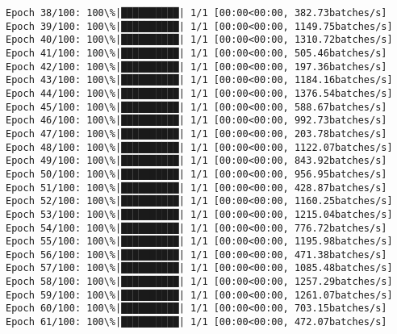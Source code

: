 \documentclass[11pt]{article}
\begin{document}
\begin{Verbatim}[commandchars=\\\{\}]
Epoch 38/100: 100\%|██████████| 1/1 [00:00<00:00, 382.73batches/s]
Epoch 39/100: 100\%|██████████| 1/1 [00:00<00:00, 1149.75batches/s]
Epoch 40/100: 100\%|██████████| 1/1 [00:00<00:00, 1310.72batches/s]
Epoch 41/100: 100\%|██████████| 1/1 [00:00<00:00, 505.46batches/s]
Epoch 42/100: 100\%|██████████| 1/1 [00:00<00:00, 197.36batches/s]
Epoch 43/100: 100\%|██████████| 1/1 [00:00<00:00, 1184.16batches/s]
Epoch 44/100: 100\%|██████████| 1/1 [00:00<00:00, 1376.54batches/s]
Epoch 45/100: 100\%|██████████| 1/1 [00:00<00:00, 588.67batches/s]
Epoch 46/100: 100\%|██████████| 1/1 [00:00<00:00, 992.73batches/s]
Epoch 47/100: 100\%|██████████| 1/1 [00:00<00:00, 203.78batches/s]
Epoch 48/100: 100\%|██████████| 1/1 [00:00<00:00, 1122.07batches/s]
Epoch 49/100: 100\%|██████████| 1/1 [00:00<00:00, 843.92batches/s]
Epoch 50/100: 100\%|██████████| 1/1 [00:00<00:00, 956.95batches/s]
Epoch 51/100: 100\%|██████████| 1/1 [00:00<00:00, 428.87batches/s]
Epoch 52/100: 100\%|██████████| 1/1 [00:00<00:00, 1160.25batches/s]
Epoch 53/100: 100\%|██████████| 1/1 [00:00<00:00, 1215.04batches/s]
Epoch 54/100: 100\%|██████████| 1/1 [00:00<00:00, 776.72batches/s]
Epoch 55/100: 100\%|██████████| 1/1 [00:00<00:00, 1195.98batches/s]
Epoch 56/100: 100\%|██████████| 1/1 [00:00<00:00, 471.38batches/s]
Epoch 57/100: 100\%|██████████| 1/1 [00:00<00:00, 1085.48batches/s]
Epoch 58/100: 100\%|██████████| 1/1 [00:00<00:00, 1257.29batches/s]
Epoch 59/100: 100\%|██████████| 1/1 [00:00<00:00, 1261.07batches/s]
Epoch 60/100: 100\%|██████████| 1/1 [00:00<00:00, 703.15batches/s]
Epoch 61/100: 100\%|██████████| 1/1 [00:00<00:00, 472.07batches/s]
    \end{Verbatim}
\end{document}
